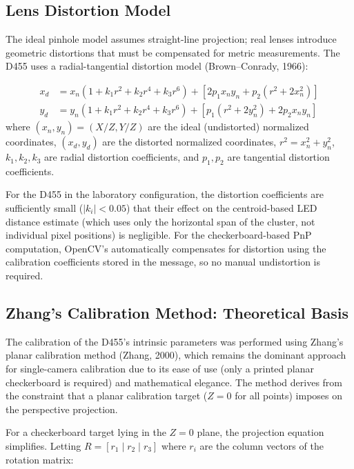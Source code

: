 \subsection{Lens Distortion Model}

The ideal pinhole model assumes straight-line projection; real lenses introduce geometric distortions that must be compensated for metric measurements. The D455 uses a radial-tangential distortion model (Brown--Conrady, 1966):

\begin{eqblock}
\begin{align}
x_d &= x_n(1 + k_1 r^2 + k_2 r^4 + k_3 r^6) + \left[2p_1 x_n y_n + p_2(r^2+2x_n^2)\right] \\
y_d &= y_n(1 + k_1 r^2 + k_2 r^4 + k_3 r^6) + \left[p_1(r^2+2y_n^2) + 2p_2 x_n y_n\right]
\end{align}
where $(x_n,y_n)=(X/Z,Y/Z)$ are the ideal (undistorted) normalized coordinates, $(x_d,y_d)$ are the distorted normalized coordinates, $r^2 = x_n^2+y_n^2$, $k_1,k_2,k_3$ are radial distortion coefficients, and $p_1,p_2$ are tangential distortion coefficients.
\end{eqblock}

For the D455 in the laboratory configuration, the distortion coefficients are sufficiently small ($|k_i| < 0.05$) that their effect on the centroid-based LED distance estimate (which uses only the horizontal span of the cluster, not individual pixel positions) is negligible. For the checkerboard-based PnP computation, OpenCV's  automatically compensates for distortion using the calibration coefficients stored in the  message, so no manual undistortion is required.

\subsection{Zhang's Calibration Method: Theoretical Basis}

The calibration of the D455's intrinsic parameters was performed using Zhang's planar calibration method (Zhang, 2000), which remains the dominant approach for single-camera calibration due to its ease of use (only a printed planar checkerboard is required) and mathematical elegance. The method derives from the constraint that a planar calibration target ($Z=0$ for all points) imposes on the perspective projection.

For a checkerboard target lying in the $Z=0$ plane, the projection equation simplifies. Letting $R=[r_1 \mid r_2 \mid r_3]$ where $r_i$ are the column vectors of the rotation matrix:

